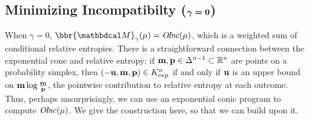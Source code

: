 \documentclass[twoside]{article}
\begin{document}
\subsection{%
    Minimizing Incompatibilty
    (\texorpdfstring{$\boldsymbol\gamma\boldsymbol=\mathbf{0}$}{gamma=0})%
} \label{sec:minimize-inc}

When $\gamma = 0$, $\bbr{\dg M}_\gamma(\mu)= \OInc(\mu)$, which is a
weighted sum of conditional relative entropies.
There is a straightforward connection between the exponential cone and
relative entropy:
if $\mathbf{m}, \mathbf{p} \in \Delta^{n-1} \subset \mathbb R^n$ are points on
a probability simplex,
then $(-\mathbf{u}, \mathbf{m}, \mathbf{p}) \in K_{\exp}^n$ if and only if
$\mathbf{u}$ is an upper bound on $\mathbf{m} \log \frac{\mathbf{m}}{\mathbf{p}}$,
the pointwise contribution to relative entropy at each outcome.
Thus, perhaps unsurprisingly, we can use an exponential conic program
to compute $\mathit{O\mskip-2.5muI\mskip-3.5mun\mskip-1.7muc}(\mu)$.
We give the construction here,
so that we can build upon it.
\end{document}
